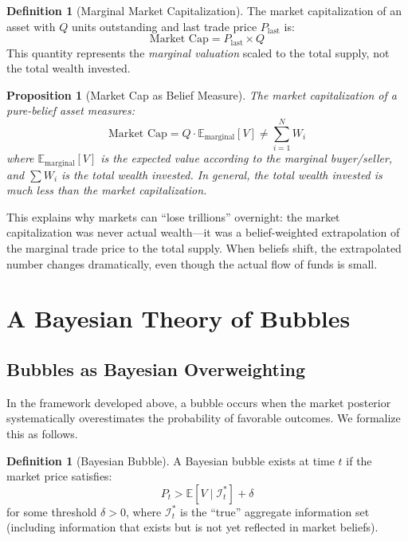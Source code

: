 \documentclass[12pt,a4paper]{article}
\newtheorem{proposition}[theorem]{Proposition}
\theoremstyle{definition}
\newtheorem{definition}[theorem]{Definition}
\newcommand{\E}{\mathbb{E}}
\newcommand{\I}{\mathcal{I}}
\begin{document}
\begin{definition}[Marginal Market Capitalization]\label{def:marginal_cap}
The market capitalization of an asset with $Q$ units outstanding and last trade price $P_{\text{last}}$ is:
\begin{equation}
    \text{Market Cap} = P_{\text{last}} \times Q
\end{equation}
This quantity represents the \emph{marginal valuation} scaled to the total supply, not the total wealth invested.
\end{definition}

\begin{proposition}[Market Cap as Belief Measure]\label{prop:cap_belief}
The market capitalization of a pure-belief asset measures:
\begin{equation}
    \text{Market Cap} = Q \cdot \E_{\text{marginal}}[V] \neq \sum_{i=1}^{N} W_i
\end{equation}
where $\E_{\text{marginal}}[V]$ is the expected value according to the marginal buyer/seller, and $\sum W_i$ is the total wealth invested. In general, the total wealth invested is much less than the market capitalization.
\end{proposition}

This explains why markets can ``lose trillions'' overnight: the market capitalization was never actual wealth---it was a belief-weighted extrapolation of the marginal trade price to the total supply. When beliefs shift, the extrapolated number changes dramatically, even though the actual flow of funds is small.



\section{A Bayesian Theory of Bubbles}\label{sec:bubbles}

\subsection{Bubbles as Bayesian Overweighting}

In the framework developed above, a bubble occurs when the market posterior systematically overestimates the probability of favorable outcomes. We formalize this as follows.

\begin{definition}[Bayesian Bubble]\label{def:bubble}
A Bayesian bubble exists at time $t$ if the market price satisfies:
\begin{equation}\label{eq:bubble_def}
    P_t > \E[V \mid \I^*_t] + \delta
\end{equation}
for some threshold $\delta > 0$, where $\I^*_t$ is the ``true'' aggregate information set (including information that exists but is not yet reflected in market beliefs).
\end{definition}
\end{document}

